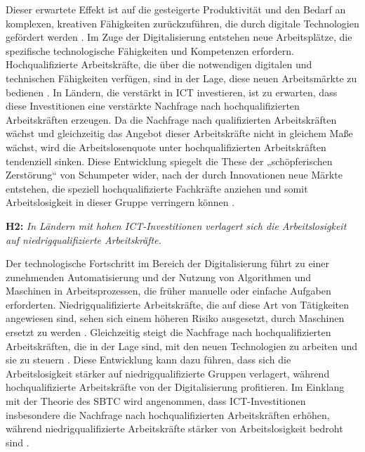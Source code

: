Dieser erwartete Effekt ist auf die gesteigerte Produktivität und den Bedarf an komplexen, 
kreativen Fähigkeiten zurückzuführen, die durch digitale Technologien gefördert werden 
\parencite[vgl.][S. 1070–1071]{acemoglu2011skills}. Im Zuge der Digitalisierung entstehen neue 
Arbeitsplätze, die spezifische technologische Fähigkeiten und Kompetenzen erfordern. 
Hochqualifizierte Arbeitskräfte, die über die notwendigen digitalen und technischen 
Fähigkeiten verfügen, sind in der Lage, diese neuen Arbeitsmärkte zu bedienen 
\parencite[vgl.][1071]{acemoglu2011skills}. In Ländern, die verstärkt in \ac{ICT} investieren, 
ist zu erwarten, dass diese Investitionen eine verstärkte Nachfrage nach hochqualifizierten 
Arbeitskräften erzeugen. Da die Nachfrage nach qualifizierten Arbeitskräften wächst und 
gleichzeitig das Angebot dieser Arbeitskräfte nicht in gleichem Maße wächst, wird die 
Arbeitslosenquote unter hochqualifizierten Arbeitskräften tendenziell sinken. Diese Entwicklung 
spiegelt die These der „schöpferischen Zerstörung“ von Schumpeter wider, nach der durch 
Innovationen neue Märkte entstehen, die speziell hochqualifizierte Fachkräfte anziehen und 
somit Arbeitslosigkeit in dieser Gruppe verringern können 
\parencite[vgl.][S. 83]{schumpeter1976capitalism}.

\textbf{H2:} \textit{In Ländern mit hohen \ac{ICT}-Investitionen verlagert sich die Arbeitslosigkeit 
auf niedrigqualifizierte Arbeitskräfte.}

Der technologische Fortschritt im Bereich der Digitalisierung führt zu einer zunehmenden 
Automatisierung und der Nutzung von Algorithmen und Maschinen in Arbeitsprozessen, die 
früher manuelle oder einfache Aufgaben erforderten. Niedrigqualifizierte Arbeitskräfte, die 
auf diese Art von Tätigkeiten angewiesen sind, sehen sich einem höheren Risiko ausgesetzt, 
durch Maschinen ersetzt zu werden \parencite[vgl.][S. 9-12]{autor2015whyare}. Gleichzeitig 
steigt die Nachfrage nach hochqualifizierten Arbeitskräften, die in der Lage sind, mit den 
neuen Technologien zu arbeiten und sie zu steuern \parencite[vgl.][S. 12]{autor2015whyare}. 
Diese Entwicklung kann dazu führen, dass sich die Arbeitslosigkeit stärker auf 
niedrigqualifizierte Gruppen verlagert, während hochqualifizierte Arbeitskräfte von der 
Digitalisierung profitieren. Im Einklang mit der Theorie des \ac{SBTC} wird angenommen, dass 
\ac{ICT}-Investitionen insbesondere die Nachfrage nach hochqualifizierten Arbeitskräften 
erhöhen, während niedrigqualifizierte Arbeitskräfte stärker von Arbeitslosigkeit bedroht 
sind \parencite[vgl.][S. 1070-1072]{acemoglu2011skills}.

